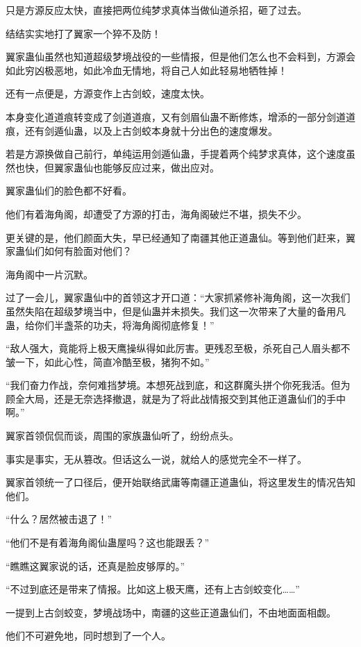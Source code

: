 \begin{this_body}
只是方源反应太快，直接把两位纯梦求真体当做仙道杀招，砸了过去。

结结实实地打了翼家一个猝不及防！

翼家蛊仙虽然也知道超级梦境战役的一些情报，但是他们怎么也不会料到，方源会如此穷凶极恶地，如此冷血无情地，将自己人如此轻易地牺牲掉！

还有一点便是，方源变作上古剑蛟，速度太快。

本身变化道道痕转变成了剑道道痕，又有剑眉仙蛊不断修炼，增添的一部分剑道道痕，还有剑遁仙蛊，以及上古剑蛟本身就十分出色的速度爆发。

若是方源换做自己前行，单纯运用剑遁仙蛊，手提着两个纯梦求真体，这个速度虽然也快，但翼家蛊仙也能够反应过来，做出应对。

翼家蛊仙们的脸色都不好看。

他们有着海角阁，却遭受了方源的打击，海角阁破烂不堪，损失不少。

更关键的是，他们颜面大失，早已经通知了南疆其他正道蛊仙。等到他们赶来，翼家蛊仙们如何有脸面对他们？

海角阁中一片沉默。

过了一会儿，翼家蛊仙中的首领这才开口道：“大家抓紧修补海角阁，这一次我们虽然失陷在超级梦境当中，但是仙蛊并未损失。我们这一次带来了大量的备用凡蛊，给你们半盏茶的功夫，将海角阁彻底修复！”

“敌人强大，竟能将上极天鹰操纵得如此厉害。更残忍至极，杀死自己人眉头都不皱一下，如此心性，简直冷酷至极，猪狗不如。”

“我们奋力作战，奈何难挡梦境。本想死战到底，和这群魔头拼个你死我活。但为顾全大局，还是无奈选择撤退，就是为了将此战情报交到其他正道蛊仙们的手中啊。”

翼家首领侃侃而谈，周围的家族蛊仙听了，纷纷点头。

事实是事实，无从篡改。但话这么一说，就给人的感觉完全不一样了。

翼家首领统一了口径后，便开始联络武庸等南疆正道蛊仙，将这里发生的情况告知他们。

“什么？居然被击退了！”

“他们不是有着海角阁仙蛊屋吗？这也能跟丢？”

“瞧瞧这翼家说的话，还真是脸皮够厚的。”

“不过到底还是带来了情报。比如这上极天鹰，还有上古剑蛟变化……”

一提到上古剑蛟变，梦境战场中，南疆的这些正道蛊仙们，不由地面面相觑。

他们不可避免地，同时想到了一个人。


\end{this_body}
